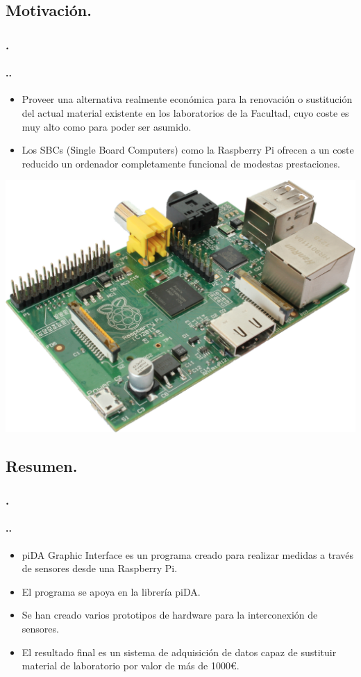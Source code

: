 \documentclass{beamer}
\newenvironment{slide}	%
{\begin{frame}[environment=slide]
\frametitle{\insertsectionnumber.\insertsection}
\framesubtitle{\setlength{\parindent}{2ex} \insertsectionnumber.\insertsubsectionnumber.\insertsubsection}}
{\end{frame}}
\begin{document}
\subsection{Motivación.}
\begin{slide}
	\begin{itemize}
		\item Proveer una alternativa realmente económica para la renovación o sustitución del actual material existente en los laboratorios de la Facultad, cuyo coste es muy alto como para poder ser asumido.
	
		\item Los SBCs (Single Board Computers) como la Raspberry Pi ofrecen a un coste reducido un ordenador completamente funcional de modestas prestaciones.
	\end{itemize}
	\begin{center}
		\includegraphics[scale=0.1]{Rpi-B-transp.png}
	\end{center}	
	
\end{slide}

\subsection{Resumen.}
\begin{slide}
	\begin{itemize}
		\item piDA Graphic Interface es un programa creado para realizar medidas a través de sensores desde una Raspberry Pi.
		\item El programa se apoya en la librería piDA.%
		\item Se han creado varios prototipos de hardware para la interconexión de sensores.
		\item El resultado final es un sistema de adquisición de datos capaz de sustituir material de laboratorio por valor de más de 1000€.
	\end{itemize}
\end{slide}
\end{document}

